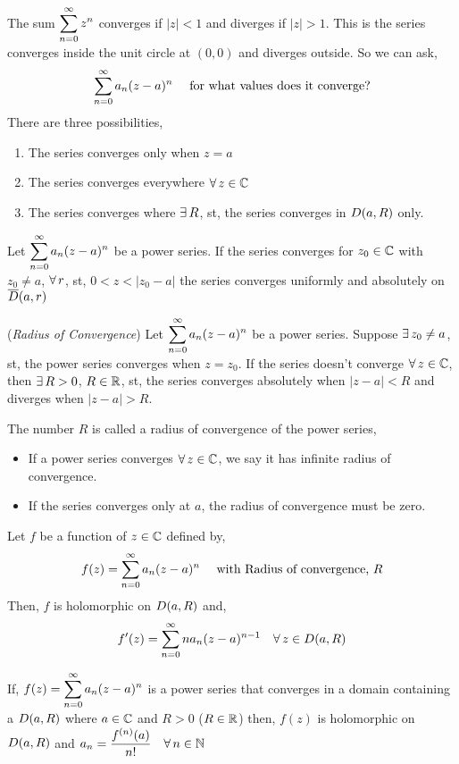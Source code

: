 \documentclass{article}
\begin{document}
The sum $\displaystyle{\sum_{n=0}^\infty z^n}$ converges if $|z| < 1$ and diverges if $|z| > 1$. This is the series converges inside the unit circle at $(0, 0)$ and diverges outside. So we can ask,
$$ \sum_{n=0}^\infty a_n(z - a)^n \quad\text{ for what values does it converge?} $$
There are three possibilities,
\begin{enumerate}
  \item The series converges only when $z = a$
  \item The series converges everywhere $\forall\, z\in\mathbb{C}$
  \item The series converges where $\exists\, R$, st, the series converges in $D(a, R)$ only.
\end{enumerate}

\begin{nlemma}
  Let $\displaystyle{\sum_{n=0}^\infty a_n(z - a)^n}$ be a power series. If the series converges for $z_0\in\mathbb{C}$ with $z_0 \ne a$, $\forall\, r$, st, $0 < z < |z_0 - a|$ the series converges uniformly and absolutely on $\overline D(a, r)$
\end{nlemma}

\begin{nthm}{(\textit{Radius of Convergence})}
  Let $\displaystyle{\sum_{n=0}^\infty a_n(z - a)^n}$ be a power series. Suppose $\exists\, z_0 \ne a$, st, the power series converges when $z = z_0$. If the series doesn't converge $\forall\, z\in\mathbb{C}$, then $\exists\, R > 0$, $R \in\mathbb{R}$, st, the series converges absolutely when $|z - a| < R$ and diverges when $|z - a| > R$.
\end{nthm}

The number $R$ is called a radius of convergence of the power series,
\begin{itemize}
  \item If a power series converges $\forall\, z \in\mathbb{C}$, we say it has infinite radius of convergence.
  \item  If the series converges only at $a$, the radius of convergence must be zero.
\end{itemize}

\begin{nthm}
  Let $f$ be a function of $z\in\mathbb{C}$ defined by,
  $$ f(z) = \sum_{n=0}^\infty a_n(z - a)^n \quad \text{ with Radius of convergence, $R$} $$
  Then, $f$ is holomorphic on $D(a, R)$ and,
  $$ f'(z) = \sum_{n=0}^\infty na_n(z - a)^{n-1} \quad \forall\, z\in D(a, R) $$
\end{nthm}

\begin{nthm}
  If, $\displaystyle{f(z) = \sum_{n=0}^\infty a_n(z - a)^n}$ is a power series that converges in a domain containing a $D(a, R)$ where $a\in\mathbb{C}$ and $R > 0$ ($R\in\mathbb{R}$) then, $f(z)$ is holomorphic on $D(a, R)$ and $\displaystyle{a_n = \frac{f^{(n)}(a)}{n!} \quad \forall\,n\in\mathbb{N}}$
\end{nthm}
\end{document}

